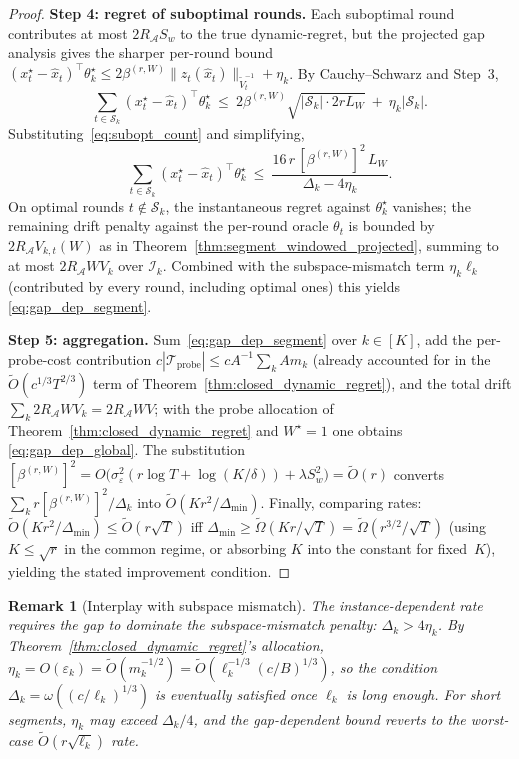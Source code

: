 \documentclass[11pt]{article}
\newcommand{\cA}{\mathcal{A}}
\newcommand{\cI}{\mathcal{I}}
\newcommand{\cTprobe}{\mathcal{T}_{\mathrm{probe}}}
\newtheorem{remark}{Remark}
\begin{document}
\begin{proof}
\textbf{Step 4: regret of suboptimal rounds.}
Each suboptimal round contributes at most $2R_{\cA}S_w$ to the true
dynamic-regret, but the projected gap analysis gives the sharper
per-round bound
$(x_t^\star-\widehat x_t)^\top\theta_k^\star
\le 2\beta^{(r,W)}\|z_t(\widehat x_t)\|_{\widetilde V_t^{-1}}+\eta_k$.
By Cauchy--Schwarz and Step~3,
\[
  \sum_{t\in\mathcal{S}_k}(x_t^\star-\widehat x_t)^\top\theta_k^\star
  \ \le\ 2\beta^{(r,W)}\sqrt{|\mathcal{S}_k|\cdot 2rL_W}
    \ +\ \eta_k|\mathcal{S}_k|.
\]
Substituting~\eqref{eq:subopt_count} and simplifying,
\[
  \sum_{t\in\mathcal{S}_k}(x_t^\star-\widehat x_t)^\top\theta_k^\star
  \ \le\ \frac{16\,r\,[\beta^{(r,W)}]^2\,L_W}{\Delta_k-4\eta_k}.
\]
On optimal rounds $t\notin\mathcal{S}_k$, the instantaneous
regret against $\theta_k^\star$ vanishes; the remaining drift penalty
against the per-round oracle $\theta_t$ is bounded by
$2R_{\cA}V_{k,t}(W)$ as in
Theorem~\ref{thm:segment_windowed_projected}, summing to at most
$2R_{\cA}WV_k$ over $\cI_k$.
Combined with the subspace-mismatch term $\eta_k\ell_k$ (contributed by
every round, including optimal ones) this yields
\eqref{eq:gap_dep_segment}.

\textbf{Step 5: aggregation.}
Sum~\eqref{eq:gap_dep_segment} over $k\in[K]$, add the per-probe-cost
contribution $c|\cTprobe|\le cA^{-1}\sum_k A m_k$ (already accounted
for in the $\widetilde O(c^{1/3}T^{2/3})$ term of
Theorem~\ref{thm:closed_dynamic_regret}), and the total drift
$\sum_k 2R_{\cA}WV_k=2R_{\cA}WV$; with the probe allocation of
Theorem~\ref{thm:closed_dynamic_regret} and $W^\star=1$ one obtains
\eqref{eq:gap_dep_global}.  The substitution
$[\beta^{(r,W)}]^2=O\bigl(\sigma_\varepsilon^2(r\log T+\log(K/\delta))
+\lambda S_w^2\bigr)=\widetilde O(r)$ converts
$\sum_k r[\beta^{(r,W)}]^2/\Delta_k$ into
$\widetilde O(Kr^2/\Delta_{\min})$.
Finally, comparing rates:
$\widetilde O(Kr^2/\Delta_{\min})\le\widetilde O(r\sqrt T)$ iff
$\Delta_{\min}\ge\widetilde\Omega(Kr/\sqrt T)
=\widetilde\Omega(r^{3/2}/\sqrt T)$ (using $K\le\sqrt r$ in the
common regime, or absorbing $K$ into the constant for fixed~$K$),
yielding the stated improvement condition.
\end{proof}

\begin{remark}[Interplay with subspace mismatch]
\label{rem:gap_vs_mismatch}
The instance-dependent rate requires the gap to dominate the
subspace-mismatch penalty: $\Delta_k>4\eta_k$.
By Theorem~\ref{thm:closed_dynamic_regret}'s allocation,
$\eta_k=O(\varepsilon_k)=\widetilde O(m_k^{-1/2})
=\widetilde O(\ell_k^{-1/3}(c/B)^{1/3})$, so the condition
$\Delta_k=\omega((c/\ell_k)^{1/3})$ is eventually satisfied once
$\ell_k$ is long enough.  For short segments, $\eta_k$ may exceed
$\Delta_k/4$, and the gap-dependent bound reverts to the worst-case
$\widetilde O(r\sqrt{\ell_k})$ rate.
\end{remark}
\end{document}
